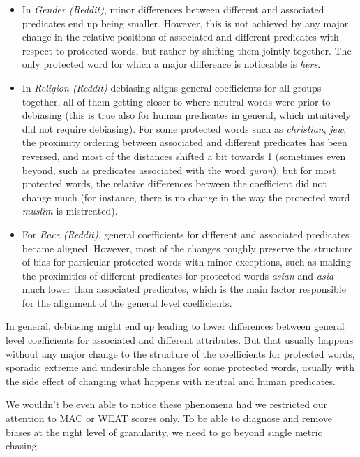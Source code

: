 \documentclass{clv3}
\begin{document}
\begin{itemize}
\item
  In \emph{Gender (Reddit)}, minor differences between different and
  associated predicates end up being smaller. However, this is not
  achieved by any major change in the relative positions of associated
  and different predicates with respect to protected words, but rather
  by shifting them jointly together. The only protected word for which a
  major difference is noticeable is \emph{hers}.
\item
  In \emph{Religion (Reddit)} debiasing aligns general coefficients for
  all groups together, all of them getting closer to where neutral words
  were prior to debiasing (this is true also for human predicates in
  general, which intuitively did not require debiasing). For some
  protected words such as \emph{christian}, \emph{jew}, the proximity
  ordering between associated and different predicates has been
  reversed, and most of the distances shifted a bit towards 1 (sometimes
  even beyond, such as predicates associated with the word
  \emph{quran}), but for most protected words, the relative differences
  between the coefficient did not change much (for instance, there is no
  change in the way the protected word \emph{muslim} is mistreated).
\item
  For \emph{Race (Reddit)}, general coefficients for different and
  associated predicates became aligned. However, most of the changes
  roughly preserve the structure of bias for particular protected words
  with minor exceptions, such as making the proximities of different
  predicates for protected words \emph{asian} and \emph{asia} much lower
  than associated predicates, which is the main factor responsible for
  the alignment of the general level coefficients.
\end{itemize}

In general, debiasing might end up leading to lower differences between
general level coefficients for associated and different attributes. But
that usually happens without any major change to the structure of the
coefficients for protected words, sporadic extreme and undesirable
changes for some protected words, usually with the side effect of
changing what happens with neutral and human predicates.

We wouldn't be even able to notice these phenomena had we restricted our
attention to \textsf{MAC} or \textsf{WEAT} scores only. To be able to
diagnose and remove biases at the right level of granularity, we need to
go beyond single metric chasing.
\end{document}

